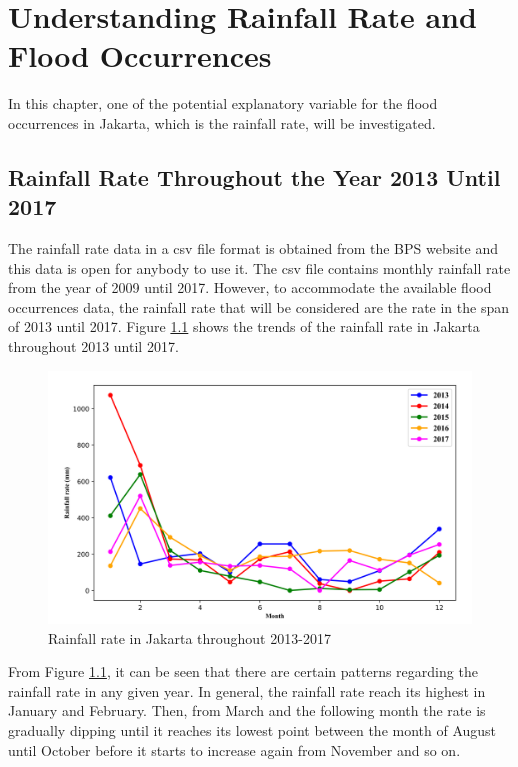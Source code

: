 \chapter{Understanding Rainfall Rate and Flood Occurrences}

In this chapter, one of the potential explanatory variable for the flood occurrences in Jakarta, which is the rainfall rate, will be investigated. \\

\section{Rainfall Rate Throughout the Year 2013 Until 2017}

The rainfall rate data in a csv file format is obtained from the BPS website and this data is open for anybody to use it. The csv file contains monthly rainfall rate from the year of 2009 until 2017. However, to accommodate the available flood occurrences data, the rainfall rate that will be considered are the rate in the span of 2013 until 2017. Figure \ref{fig=rainfall.png} shows the trends of the rainfall rate in Jakarta throughout 2013 until 2017.\\

\begin{figure}
\begin{center}
\graphicspath{ {./Pict/} }
\includegraphics[scale=0.15]{rainfall.png}
\caption{Rainfall rate in Jakarta throughout 2013-2017}\label{fig=rainfall.png}
\end{center}
\end{figure}

\noindent
From Figure \ref{fig=rainfall.png}, it can be seen that there are certain patterns regarding the rainfall rate in any given year. In general, the rainfall rate reach its highest in January and February. Then, from March and the following month the rate is gradually dipping until it  reaches its lowest point between the month of August until October before it starts to increase again from November and so on. \\

